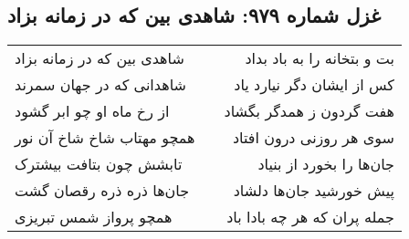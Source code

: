 \begin{center}
\section*{غزل شماره ۹۷۹: شاهدی بین که در زمانه بزاد}
\label{sec:0979}
\begin{longtable}{l p{0.5cm} r}
شاهدی بین که در زمانه بزاد
&&
بت و بتخانه را به باد بداد
\\
شاهدانی که در جهان سمرند
&&
کس از ایشان دگر نیارد یاد
\\
از رخ ماه او چو ابر گشود
&&
هفت گردون ز همدگر بگشاد
\\
همچو مهتاب شاخ شاخ آن نور
&&
سوی هر روزنی درون افتاد
\\
تابشش چون بتافت بیشترک
&&
جان‌ها را بخورد از بنیاد
\\
جان‌ها ذره ذره رقصان گشت
&&
پیش خورشید جان‌ها دلشاد
\\
همچو پرواز شمس تبریزی
&&
جمله پران که هر چه بادا باد
\\
\end{longtable}
\end{center}
